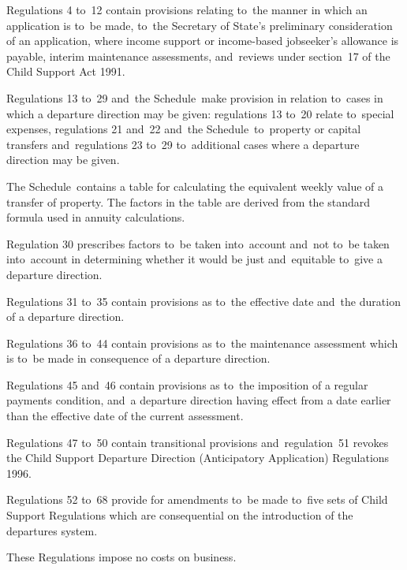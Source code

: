 \documentclass[12pt,a4paper]{article}
\begin{document}
Regulations 4 to~12 contain provisions relating to~the manner in which an
application is to~be made, to~the Secretary of State’s preliminary consideration
of an application, where income support or income-based jobseeker’s allowance is
payable, interim maintenance assessments, and~reviews under section~17 of the
Child Support Act 1991.

Regulations 13 to~29 and~the Schedule~make provision in relation to~cases in
which a departure direction may be given: regulations 13 to~20 relate to~special
expenses, regulations 21 and~22 and~the Schedule~to~property or capital
transfers and~regulations 23 to~29 to~additional cases where a departure
direction may be given.

The Schedule~contains a table for calculating the equivalent weekly value of a
transfer of property. The factors in the table are derived from the standard
formula used in annuity calculations.

Regulation 30 prescribes factors to~be taken into~account and~not to~be taken
into~account in determining whether it would be just and~equitable to~give a
departure direction.

Regulations 31 to~35 contain provisions as to~the effective date and~the
duration of a departure direction.

Regulations 36 to~44 contain provisions as to~the maintenance assessment which
is to~be made in consequence of a departure direction.

Regulations 45 and~46 contain provisions as to~the imposition of a regular
payments condition, and~a departure direction having effect from a date earlier
than the effective date of the current assessment.

Regulations 47 to~50 contain transitional provisions and~regulation~51 revokes
the Child Support Departure Direction (Anticipatory Application) Regulations
1996.

Regulations 52 to~68 provide for amendments to~be made to~five sets of Child
Support Regulations which are consequential on the introduction of the
departures system.

  These Regulations impose no costs on business.
\end{document}
